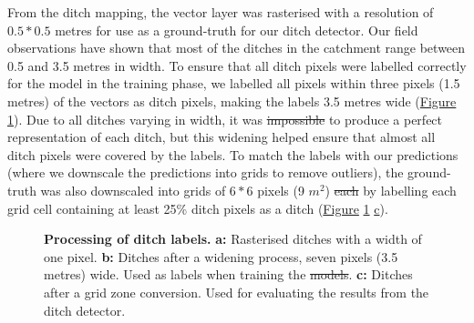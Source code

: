 \documentclass[11pt, review]{elsarticle} %
\providecommand{\DIFaddtex}[1]{{\protect\color{blue}\uwave{#1}}} %
\providecommand{\DIFdeltex}[1]{{\protect\color{red}\sout{#1}}}                      %
\providecommand{\DIFaddbegin}{} %
\providecommand{\DIFaddend}{} %
\providecommand{\DIFdelbegin}{} %
\providecommand{\DIFdelend}{} %
\providecommand{\DIFaddFL}[1]{\DIFadd{#1}} %
\providecommand{\DIFdelFL}[1]{\DIFdel{#1}} %
\providecommand{\DIFaddbeginFL}{} %
\providecommand{\DIFaddendFL}{} %
\providecommand{\DIFdelbeginFL}{} %
\providecommand{\DIFdelendFL}{} %
\providecommand{\DIFadd}[1]{\texorpdfstring{\DIFaddtex{#1}}{#1}} %
\providecommand{\DIFdel}[1]{\texorpdfstring{\DIFdeltex{#1}}{}} %
\begin{document}
From the ditch mapping, the vector layer was rasterised with a resolution of $0.5*0.5$ metres for use as a ground-truth for our ditch detector. Our field observations have shown that most of the ditches in the catchment range between 0.5 and 3.5 metres in width. To ensure that all ditch pixels were labelled correctly for the model in the training phase, we labelled all pixels within three pixels (1.5 metres) of the vectors as ditch pixels, making the labels 3.5 metres wide (\hyperref[fig:ditchpreprocess]{Figure} \ref{fig:ditchpreprocess}). Due to all ditches varying in width, it was \DIFdelbegin \DIFdel{impossible }\DIFdelend \DIFaddbegin \DIFadd{not possible }\DIFaddend to produce a perfect representation of each ditch, but this widening helped ensure that almost all ditch pixels were covered by the labels. To match the labels with our predictions (where we downscale the predictions into grids to remove outliers), the ground-truth was also downscaled into grids of $6*6$ pixels (9 $m^2$) \DIFdelbegin \DIFdel{each }\DIFdelend by labelling each grid cell containing at least 25\% ditch pixels as a ditch (\hyperref[fig:ditchpreprocess]{Figure} \ref{fig:ditchpreprocess} \hyperref[fig:ditchpreprocess]{c}).

\begin{figure} [!htb]
    \centering
    \hspace{5pt}
    \caption{\textbf{Processing of ditch labels.} \textbf{a: }Rasterised ditches with a width of one pixel. \textbf{b: }Ditches after a widening process, seven pixels (3.5 metres) wide. Used as labels when training the \DIFdelbeginFL \DIFdelFL{models}\DIFdelendFL \DIFaddbeginFL \DIFaddFL{model}\DIFaddendFL . \textbf{c: }Ditches after a grid zone conversion. Used for evaluating the results from the ditch detector.} \label{sample-figure}
    \label{fig:ditchpreprocess}
\end{figure}
\end{document}
